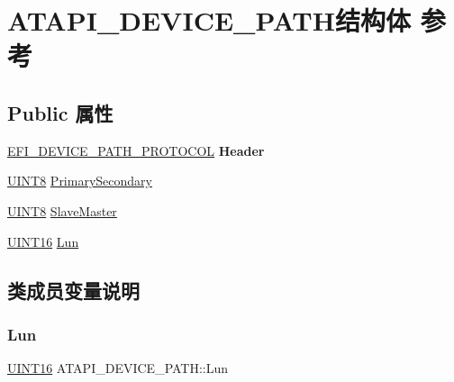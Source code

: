 \hypertarget{struct_a_t_a_p_i___d_e_v_i_c_e___p_a_t_h}{}\section{A\+T\+A\+P\+I\+\_\+\+D\+E\+V\+I\+C\+E\+\_\+\+P\+A\+T\+H结构体 参考}
\label{struct_a_t_a_p_i___d_e_v_i_c_e___p_a_t_h}
\subsection*{Public 属性}
\begin{DoxyCompactItemize}
\item 
\mbox{\label{struct_a_t_a_p_i___d_e_v_i_c_e___p_a_t_h_ac9f5f076ce3663a48f155599e6d378ac}} 
\hyperlink{struct_e_f_i___d_e_v_i_c_e___p_a_t_h___p_r_o_t_o_c_o_l}{E\+F\+I\+\_\+\+D\+E\+V\+I\+C\+E\+\_\+\+P\+A\+T\+H\+\_\+\+P\+R\+O\+T\+O\+C\+OL} {\bfseries Header}
\item 
\hyperlink{_processor_bind_8h_ab27e9918b538ce9d8ca692479b375b6a}{U\+I\+N\+T8} \hyperlink{struct_a_t_a_p_i___d_e_v_i_c_e___p_a_t_h_a7058b930e5cbcaa9613de5455f653b87}{Primary\+Secondary}
\item 
\hyperlink{_processor_bind_8h_ab27e9918b538ce9d8ca692479b375b6a}{U\+I\+N\+T8} \hyperlink{struct_a_t_a_p_i___d_e_v_i_c_e___p_a_t_h_a8da558f34b328b52fc318af84c5a1d63}{Slave\+Master}
\item 
\hyperlink{_processor_bind_8h_a09f1a1fb2293e33483cc8d44aefb1eb1}{U\+I\+N\+T16} \hyperlink{struct_a_t_a_p_i___d_e_v_i_c_e___p_a_t_h_a3c349d8108eda31b0013826372f638fa}{Lun}
\end{DoxyCompactItemize}


\subsection{类成员变量说明}
\mbox{\label{struct_a_t_a_p_i___d_e_v_i_c_e___p_a_t_h_a3c349d8108eda31b0013826372f638fa}} 
\subsubsection{\texorpdfstring{Lun}{Lun}}
{\footnotesize\ttfamily \hyperlink{_processor_bind_8h_a09f1a1fb2293e33483cc8d44aefb1eb1}{U\+I\+N\+T16} A\+T\+A\+P\+I\+\_\+\+D\+E\+V\+I\+C\+E\+\_\+\+P\+A\+T\+H\+::\+Lun}

